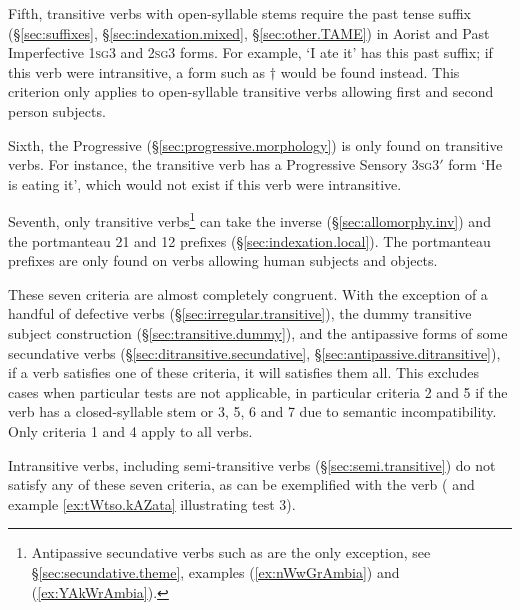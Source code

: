 Fifth, transitive verbs with open-syllable stems require the past tense  suffix (§\ref{sec:suffixes}, §\ref{sec:indexation.mixed}, §\ref{sec:other.TAME}) in Aorist and Past Imperfective \textsc{1sg}\fl{}3 and \textsc{2sg}\fl{}3 forms. For example,  `I ate it' has this past suffix; if this verb were intransitive, a form such as $\dagger$ would be found instead. This criterion only applies to open-syllable transitive verbs allowing first and second person subjects.

Sixth, the Progressive  (§\ref{sec:progressive.morphology}) is only found on transitive verbs. For instance, the transitive verb  has a Progressive Sensory 3\textsc{sg}\fl{}3$'$ form  `He is eating it', which would not exist if this verb were intransitive.

Seventh, only transitive verbs\footnote{Antipassive secundative verbs such as  are the only exception, see §\ref{sec:secundative.theme}, examples (\ref{ex:nWwGrAmbia}) and (\ref{ex:YAkWrAmbia}).} can take the inverse  (§\ref{sec:allomorphy.inv}) and the portmanteau  2\fl{}1 and  1\fl{}2  prefixes (§\ref{sec:indexation.local}). The portmanteau prefixes are only found on verbs allowing human subjects and objects. 

These seven criteria are almost completely congruent. With the exception of a handful of defective verbs (§\ref{sec:irregular.transitive}), the dummy transitive subject construction (§\ref{sec:transitive.dummy}), and the antipassive forms of some secundative verbs (§\ref{sec:ditransitive.secundative}, §\ref{sec:antipassive.ditransitive}), if a verb satisfies one of these criteria, it will satisfies them all. This excludes cases when particular tests are not applicable, in particular criteria 2 and 5 if the verb has a closed-syllable stem or 3, 5, 6 and 7 due to semantic incompatibility. Only criteria 1 and 4 apply to all verbs. 

Intransitive verbs, including semi-transitive verbs (§\ref{sec:semi.transitive}) do not satisfy any of these seven criteria, as can be exemplified with the verb  ( and example \ref{ex:tWtso.kAZata} illustrating test 3).

